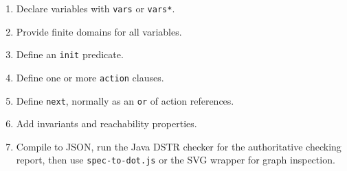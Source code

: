 \documentclass[11pt]{article}
\begin{document}
\begin{enumerate}
\item Declare variables with \texttt{vars} or \texttt{vars*}.
\item Provide finite domains for all variables.
\item Define an \texttt{init} predicate.
\item Define one or more \texttt{action} clauses.
\item Define \texttt{next}, normally as an \texttt{or} of action references.
\item Add invariants and reachability properties.
\item Compile to JSON, run the Java DSTR checker for the authoritative checking
  report, then use \texttt{spec-to-dot.js} or the SVG wrapper for graph
  inspection.
\end{enumerate}
\end{document}
